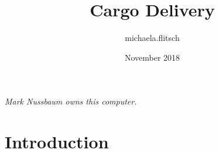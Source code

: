 \documentclass{article}
\title{Cargo Delivery}
\author{michaela.flitsch }
\date{November 2018}
\begin{document}
\emph {Mark Nussbaum owns this computer.}
\maketitle

\section{Introduction}
\end{document}
